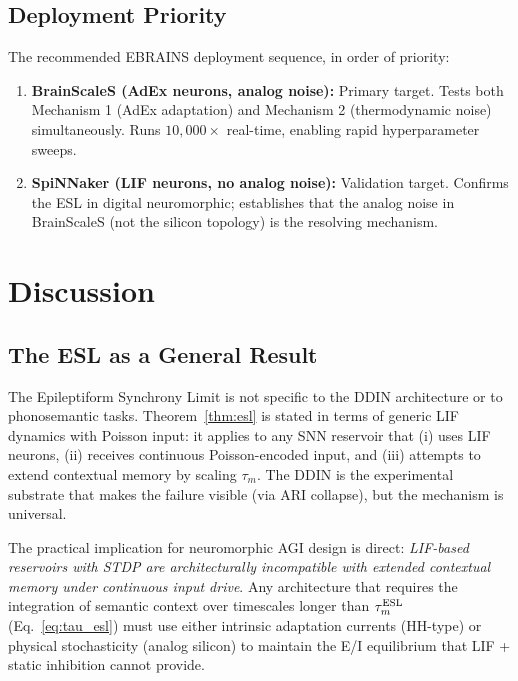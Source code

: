 \documentclass{article}
\begin{document}
\subsection{Deployment Priority}

The recommended EBRAINS deployment sequence, in order of priority:
\begin{enumerate}
  \item \textbf{BrainScaleS (AdEx neurons, analog noise):} Primary target. Tests both Mechanism 1 (AdEx adaptation) and Mechanism 2 (thermodynamic noise) simultaneously. Runs $10{,}000\times$ real-time, enabling rapid hyperparameter sweeps.
  \item \textbf{SpiNNaker (LIF neurons, no analog noise):} Validation target. Confirms the ESL in digital neuromorphic; establishes that the analog noise in BrainScaleS (not the silicon topology) is the resolving mechanism.
\end{enumerate}

\section{Discussion}

\subsection{The ESL as a General Result}

The Epileptiform Synchrony Limit is not specific to the DDIN architecture or to phonosemantic tasks. Theorem~\ref{thm:esl} is stated in terms of generic LIF dynamics with Poisson input: it applies to any SNN reservoir that (i) uses LIF neurons, (ii) receives continuous Poisson-encoded input, and (iii) attempts to extend contextual memory by scaling $\tau_m$. The DDIN is the experimental substrate that makes the failure visible (via ARI collapse), but the mechanism is universal.

The practical implication for neuromorphic AGI design is direct: \textit{LIF-based reservoirs with STDP are architecturally incompatible with extended contextual memory under continuous input drive}. Any architecture that requires the integration of semantic context over timescales longer than $\tau_m^{\rm ESL}$ (Eq.~\ref{eq:tau_esl}) must use either intrinsic adaptation currents (HH-type) or physical stochasticity (analog silicon) to maintain the E/I equilibrium that LIF + static inhibition cannot provide.
\end{document}
